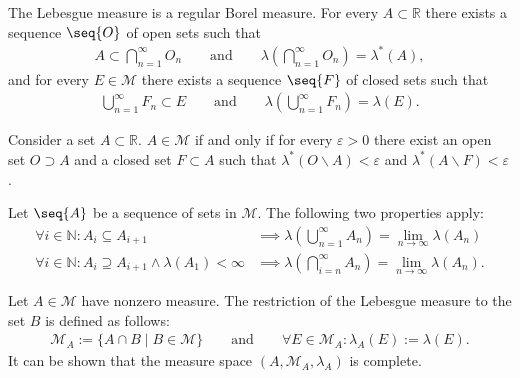     \begin{property}
        The Lebesgue measure is a regular Borel measure. For every $A\subset\mathbb{R}$ there exists a sequence $\seq{O}$ of open sets such that
        \begin{gather}
            \label{lebesgue:open_cover_existence}
            A\subset\bigcap_{n=1}^\infty O_n\qquad\text{and}\qquad\lambda\left(\bigcap_{n=1}^\infty O_n\right) = \lambda^*(A),
        \end{gather}
        and for every $E\in\mathcal{M}$ there exists a sequence $\seq{F}$ of closed sets such that
        \begin{gather}
            \label{lebesgue:closed_cover_existence}
            \bigcup_{n=1}^\infty F_n\subset E\qquad\text{and}\qquad\lambda\left(\bigcup_{n=1}^\infty F_n\right) = \lambda(E).
        \end{gather}
    \end{property}

    \begin{property}
        Consider a set $A\subset\mathbb{R}$. $A\in\mathcal{M}$ if and only if for every $\varepsilon>0$ there exist an open set $O\supset A$ and a closed set $F\subset A$ such that $\lambda^*(O\backslash A) < \varepsilon$ and $\lambda^*(A\backslash F)<\varepsilon$.
    \end{property}

    \begin{property}
        Let $\seq{A}$ be a sequence of sets in $\mathcal{M}$. The following two properties apply:
        \begin{align}
            \forall i\in\mathbb{N}:A_i\subseteq A_{i+1} &\implies \lambda\left(\bigcup_{n=1}^\infty A_n\right) = \lim_{n\rightarrow\infty}\lambda(A_n)\\
            \forall i\in\mathbb{N}:A_i\supseteq A_{i+1}\land\lambda(A_1)<\infty &\implies\lambda\left(\bigcap_{i=n}^\infty A_n\right) = \lim_{n\rightarrow\infty}\lambda(A_n).
        \end{align}
    \end{property}

    \begin{construct}[Restriction]\label{lebesgue:restricted_lebesgue_measure}
        Let $A\in\mathcal{M}$ have nonzero measure. The restriction of the Lebesgue measure to the set $B$ is defined as follows:
        \begin{gather}
            \mathcal{M}_A := \{A\cap B\mid B\in\mathcal{M}\} \qquad\text{and}\qquad \forall E\in\mathcal{M}_A:\lambda_A(E) := \lambda(E).
        \end{gather}
        It can be shown that the measure space $(A,\mathcal{M}_A,\lambda_A)$ is complete.
    \end{construct}

